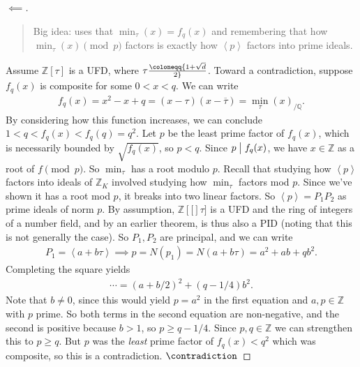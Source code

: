 \begin{proof}[$\impliedby$]

\begin{quote}
Big idea: uses that \(\min_\tau(x) = f_q(x)\) and remembering that how
\(\min_\tau(x) \pmod p\) factors is exactly how
\(\left\langle{ p }\right\rangle\) factors into prime ideals.
\end{quote}

Assume \(\mathbb{Z}\left[ { \tau } \right]\) is a UFD, where
\(\tau\coloneqq{1 + \sqrt{d} \over 2 }\). Toward a contradiction,
suppose \(f_q(x)\) is composite for some \(0<x<q\). We can write
\begin{align*}
f_q(x) = x^2 - x + q = (x - \tau)( x - {\overline{{ \tau}}} ) = \min_{ \tau}(x)_{/{\mathbb{Q}}}
.\end{align*}
By considering how this function increases, we can conclude
\(1<q<f_q(x) < f_q(q) = q^2\). Let \(p\) be the least prime factor of
\(f_q(x)\), which is necessarily bounded by \(\sqrt{ f_q(x) }\), so
\(p<q\). Since \(p\bigm|f_q(x)\), we have \(x\in {\mathbb{Z}}\) as a
root of \(f\pmod p\). So \(\min_\tau\) has a root modulo \(p\). Recall
that studying how \(\left\langle{ p }\right\rangle\) factors into ideals
of \({\mathbb{Z}}_K\) involved studying how \(\min_\tau\) factors mod
\(p\). Since we've shown it has a root mod \(p\), it breaks into two
linear factors. So \(\left\langle{ p }\right\rangle = P_1 P_2\) as prime
ideals of norm \(p\). By assumption,
\(\mathbb{Z}\left[ {[} \right]\tau]\) is a UFD and the ring of integers
of a number field, and by an earlier theorem, is thus also a PID (noting
that this is not generally the case). So \(P_1, P_2\) are principal, and
we can write
\begin{align*}
P_1 = \left\langle{ a + b \tau }\right\rangle\implies p = N(p_1) = N( a + b \tau) = a^2 + ab + qb^2
.\end{align*}
Completing the square yields
\begin{align*}
\cdots = (a + b/2)^2 + (q-1/4)b^2
.\end{align*}
Note that \(b\neq 0\), since this would yield \(p = a^2\) in the first
equation and \(a, p \in {\mathbb{Z}}\) with \(p\) prime. So both terms
in the second equation are non-negative, and the second is positive
because \(b>1\), so \(p \geq q- 1/4\). Since \(p, q\in {\mathbb{Z}}\) we
can strengthen this to \(p \geq q\). But \(p\) was the \emph{least}
prime factor of \(f_q(x) < q^2\) which was composite, so this is a
contradiction. \(\contradiction\)

\end{proof}

